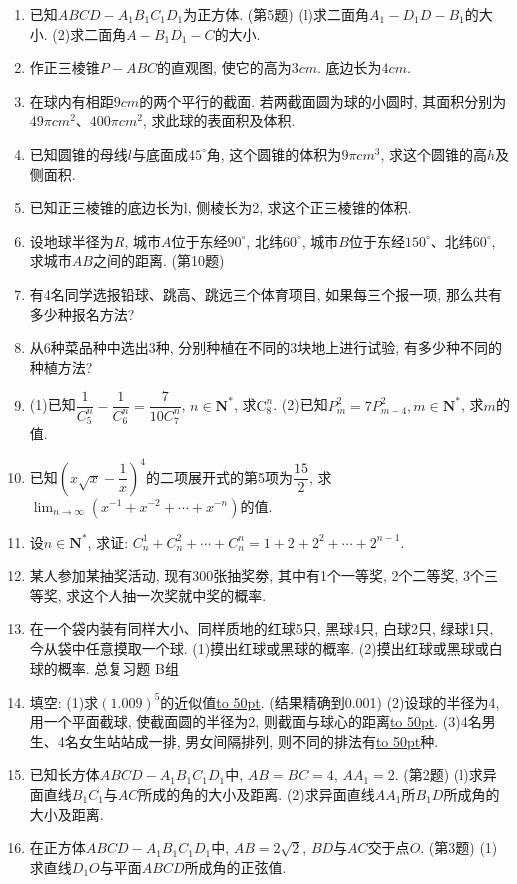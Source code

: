 \documentclass[10pt,a4paper]{article}
\newcommand{\blank}[1]{\underline{\hbox to #1pt{}}}
\begin{document}
\begin{enumerate}[1.]
\item 已知$ABCD-A_1B_1C_1D_1$为正方体.
(第5题)
(l)求二面角$A_1-D_1D-B_1$的大小.
(2)求二面角$A-B_1D_1-C$的大小.
\item 作正三棱锥$P-ABC$的直观图, 使它的高为$3cm$. 底边长为$4cm$.
\item 在球内有相距$9cm$的两个平行的截面. 若两截面圆为球的小圆时, 其面积分别为$49\pi cm^2$、$400\pi cm^2$, 求此球的表面积及体积.
\item 已知圆锥的母线$l$与底面成$45^\circ$角, 这个圆锥的体积为$9\pi cm^3$, 求这个圆锥的高$h$及侧面积.
\item 已知正三棱锥的底边长为l, 侧棱长为2, 求这个正三棱锥的体积.
\item 设地球半径为$R$, 城市$A$位于东经$90^\circ$, 北纬$60^\circ$, 城市$B$位于东经$150^\circ$、北纬$60^\circ$, 求城市$AB$之间的距离.
(第10题)
\item 有4名同学选报铅球、跳高、跳远三个体育项目, 如果每三个报一项, 那么共有多少种报名方法?
\item 从6种菜品种中选出3种, 分别种植在不同的3块地上进行试验, 有多少种不同的种植方法?
\item (1)已知$\dfrac 1{C_5^n}-\dfrac 1{C_6^n}=\dfrac 7{10C_7^n}$, $n\in \mathbf{N}^*$, 求$\mathrm{C}_8^n$.
(2)已知$P_m^2=7P_{m-4}^2,m\in \mathbf{N}^*$, 求$m$的值.
\item 已知$(x\sqrt x-\dfrac 1x)^4$的二项展开式的第5项为$\dfrac{15}2$, 求$\displaystyle\lim_{n\to\infty}(x^{-1}+x^{-2}+\cdots +x^{-n})$的值.
\item 设$n\in \mathbf{N}^*$, 求证: $C_n^1+C_n^2+\cdots +C_n^n=1+2+2^2+\cdots +2^{n-1}$.
\item 某人参加某抽奖活动, 现有300张抽奖劵, 其中有1个一等奖, 2个二等奖, 3个三等奖, 求这个人抽一次奖就中奖的概率.
\item 在一个袋内装有同样大小、同样质地的红球5只, 黑球4只, 白球2只, 绿球1只, 今从袋中任意摸取一个球.
(1)摸出红球或黑球的概率.
(2)摸出红球或黑球或白球的概率.
总复习题
B组
\item 填空:
(1)求$(1.009)^5$的近似值\blank{50}. (结果精确到0.001)
(2)设球的半径为4, 用一个平面截球, 使截面圆的半径为2, 则截面与球心的距离\blank{50}.
(3)4名男生、4名女生站站成一排, 男女间隔排列, 则不同的排法有\blank{50}种.
\item 已知长方体$ABCD-A_1B_1C_1D_1$中, $AB=BC=4$, $AA_1=2$.
(第2题)
(l)求异面直线$B_1C_1$与$AC$所成的角的大小及距离.
(2)求异面直线$AA_1$所$B_1D$所成角的大小及距离.
\item 在正方体$ABCD-A_1B_1C_1D_1$中, $AB=2\sqrt 2$, $BD$与$AC$交于点$O$.
(第3题)
(1)求直线$D_1O$与平面$ABCD$所成角的正弦值.

\end{enumerate}
\end{document}
